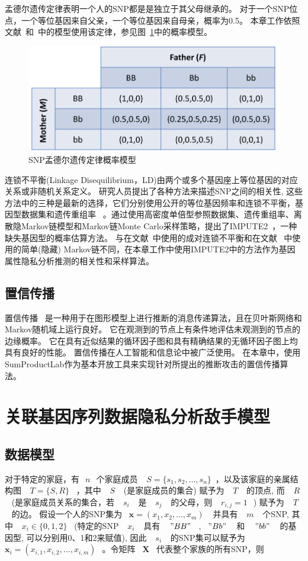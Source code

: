 孟德尔遗传定律表明一个人的SNP都是是独立于其父母继承的。 对于一个SNP位点，一个等位基因来自父亲，一个等位基因来自母亲，概率为0.5。 本章工作依照文献~\cite{humbert2013addressing}和~\cite{deznabi2018inference}中的模型使用该定律，参见图~\ref{fig:Mendelian-law}中的概率模型。

\begin{figure}[htbp]
	\centering
	\includegraphics[width=0.6\linewidth]{./figures/Mendelian-law.jpg}
	\centering
	\caption{SNP孟德尔遗传定律概率模型}\label{fig:Mendelian-law}
\end{figure}

连锁不平衡(Linkage Disequilibrium，LD)由两个或多个基因座上等位基因的对应关系或非随机关系定义。 研究人员提出了各种方法来描述SNP之间的相关性, 这些方法中的三种是最新的选择，它们分别使用公开的等位基因频率和连锁不平衡，基因型数据集和遗传重组率~\cite{samani2015quantifying} 。通过使用高密度单倍型参照数据集、遗传重组率、离散隐Markov链模型和Markov链Monte Carlo采样策略，提出了IMPUTE2~\cite{howie2014impute2}，一种缺失基因型的概率估算方法。 与在文献~\cite{humbert2013addressing,humbert2017quantifying}中使用的成对连锁不平衡和在文献~\cite{deznabi2018inference} 中使用的简单(隐藏) Markov链不同，在本章工作中使用IMPUTE2中的方法作为基因属性隐私分析推测的相关性和采样算法。

\subsection{置信传播}

置信传播~\cite{kschischang2001factor} 是一种用于在图形模型上进行推断的消息传递算法，且在贝叶斯网络和Markov随机域上运行良好。 它在观测到的节点上有条件地评估未观测到的节点的边缘概率。 它在具有近似结果的循环因子图和具有精确结果的无循环因子图上均具有良好的性能。 置信传播在人工智能和信息论中被广泛使用。 在本章中，使用 SumProductLab作为基本开放工具来实现针对所提出的推断攻击的置信传播算法。

\section{关联基因序列数据隐私分析敌手模型}
\subsection{数据模型}
对于特定的家庭，有~$~n~$~个家庭成员 ~$~S=\{s_1,s_2,...,s_n\}$~，以及该家庭的亲属结构图 ~$~T=\{S,R\}$~ ，其中 ~$~S~$~ (是家庭成员的集合) 赋予为 ~$~T~$~ 的顶点, 而 ~$~R~$~ (是家庭成员关系的集合，若 ~$~s_i~$~ 是 ~$~s_j~$~ 的父母，则 ~$~r_{i,j}=1~$~) 赋予为 ~$~T~$~ 的边。 假设一个人的SNP集为 ~$\mathbf{x}=(x_1,x_2,...,x_m)~$~ 并具有 ~$~m~$~ 个SNP, 其中 ~$~x_i \in \{0,1,2\}$~ (特定的SNP ~$~x_i~$~ 具有 ~$~"BB"~$~,~$~"Bb"~$~ 和 ~$~"bb"~$~ 的基因型, 可以分别用0、1和2来赋值), 因此 ~$~s_i~$~ 的SNP集可以赋予为 ~$\mathbf{x}_i=(x_{i,1},x_{i,2},...,x_{i,m})~$~。令矩阵 ~$\mathbf{X}$~ 代表整个家族的所有SNP，则

